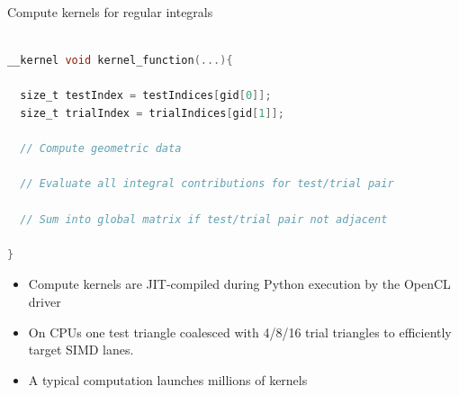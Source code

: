 \documentclass[dvipsnames,10pt]{beamer}
\begin{document}
\begin{frame}[fragile]{Compute kernels for regular integrals}

{\footnotesize
\begin{lstlisting}[language=C]

__kernel void kernel_function(...){

  size_t testIndex = testIndices[gid[0]];
  size_t trialIndex = trialIndices[gid[1]];

  // Compute geometric data
  
  // Evaluate all integral contributions for test/trial pair
  
  // Sum into global matrix if test/trial pair not adjacent

}

\end{lstlisting}
}
\begin{tcolorbox}
    \begin{itemize}
        \item Compute kernels are JIT-compiled during Python execution by the OpenCL driver
        \item On CPUs one test triangle coalesced with 4/8/16 trial triangles to efficiently target SIMD lanes.
        \item A typical computation launches millions of kernels
    \end{itemize}
\end{tcolorbox}

\end{frame}
\end{document}
